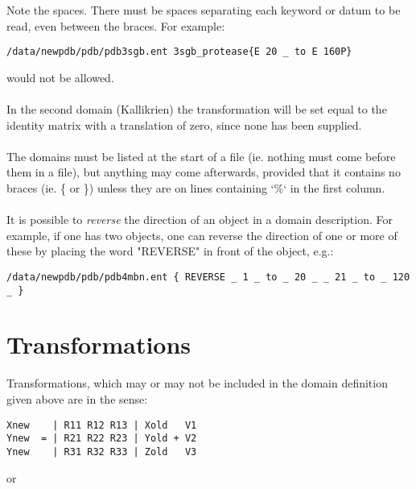 Note the spaces.  There must be spaces separating each keyword or 
datum to be read, even between the braces.  For example:

\begin{scriptsize}
\begin{verbatim}
/data/newpdb/pdb/pdb3sgb.ent 3sgb_protease{E 20 _ to E 160P}
\end{verbatim}\end{scriptsize}

would not be allowed.\\
\\
In the second domain (Kallikrien) the transformation will be set equal
to the identity matrix with a translation of zero, since none has been 
supplied.\\
\\
The domains must be listed at the start of a file (ie. nothing must
come before them in a file), but anything may come afterwards, 
provided that it contains no braces (ie. \{ or \}) unless they are on lines 
containing `\%` in the first column.\\
\\
It is possible to {\em reverse} the direction of an object in a domain
description.  For example, if one has two objects,
one can reverse the direction of one or more of these by placing the
word "REVERSE" in front of the object, e.g.:

\begin{scriptsize}\begin{verbatim}
/data/newpdb/pdb/pdb4mbn.ent { REVERSE _ 1 _ to _ 20 _ _ 21 _ to _ 120 _ } 
\end{verbatim} \end{scriptsize}


\section{Transformations}

Transformations, which may or may not be included in the domain 
definition given above are in the sense:\\

\begin{scriptsize}\begin{verbatim}
Xnew    | R11 R12 R13 | Xold   V1
Ynew  = | R21 R22 R23 | Yold + V2
Ynew    | R31 R32 R33 | Zold   V3
\end{verbatim} \end{scriptsize}

or\\

